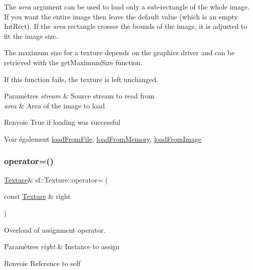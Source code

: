 The {\itshape area} argument can be used to load only a sub-\/rectangle of the whole image. If you want the entire image then leave the default value (which is an empty Int\+Rect). If the {\itshape area} rectangle crosses the bounds of the image, it is adjusted to fit the image size.

The maximum size for a texture depends on the graphics driver and can be retrieved with the get\+Maximum\+Size function.

If this function fails, the texture is left unchanged.


\begin{DoxyParams}{Paramètres}
{\em stream} & Source stream to read from \\
\hline
{\em area} & Area of the image to load\\
\hline
\end{DoxyParams}
\begin{DoxyReturn}{Renvoie}
True if loading was successful
\end{DoxyReturn}
\begin{DoxySeeAlso}{Voir également}
\hyperlink{classsf_1_1Texture_a8e1b56eabfe33e2e0e1cb03712c7fcc7}{load\+From\+File}, \hyperlink{classsf_1_1Texture_a2c4adb19dd4cbee0a588eeb85e52a249}{load\+From\+Memory}, \hyperlink{classsf_1_1Texture_abec4567ad9856a3596dc74803f26fba2}{load\+From\+Image} 
\end{DoxySeeAlso}
\mbox{\label{classsf_1_1Texture_a80a089b6b19bb09b83012d5f0e6af9ba}} 
\subsubsection{\texorpdfstring{operator=()}{operator=()}}
{\footnotesize\ttfamily \hyperlink{classsf_1_1Texture}{Texture}\& sf\+::\+Texture\+::operator= (\begin{DoxyParamCaption}\item[{const \hyperlink{classsf_1_1Texture}{Texture} \&}]{right }\end{DoxyParamCaption})}



Overload of assignment operator. 


\begin{DoxyParams}{Paramètres}
{\em right} & Instance to assign\\
\hline
\end{DoxyParams}
\begin{DoxyReturn}{Renvoie}
Reference to self 
\end{DoxyReturn}
\mbox{\label{classsf_1_1Texture_aaa87d1eff053b9d4d34a24c784a28658}} 
